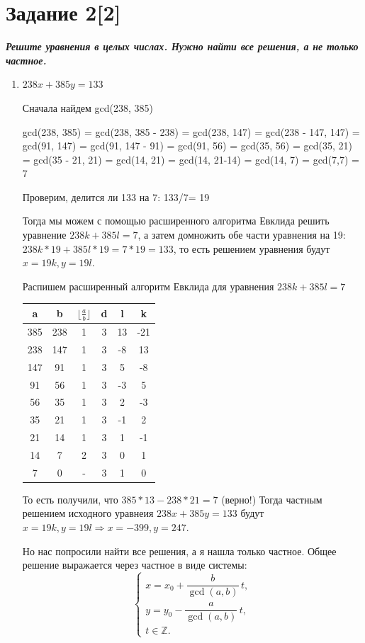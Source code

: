 \documentclass{article}
\begin{document}
\bigskip

\section*{\textbf{Задание 2[2]}} \textbf{\textit{Решите уравнения в целых числах. Нужно найти все решения, а не только частное.}}

\begin{enumerate}
    \item $238x + 385y = 133$

Сначала найдем gcd(238, 385)
 
 gcd(238, 385) = gcd(238, 385 - 238) =  gcd(238, 147) =  gcd(238 - 147, 147) =  gcd(91, 147) =  gcd(91, 147 - 91) =  gcd(91, 56) =  gcd(35, 56) =  gcd(35, 21) =  gcd(35 - 21, 21) =  gcd(14, 21) =  gcd(14, 21-14) =  gcd(14, 7) =  gcd(7,7) = 7

Проверим, делится ли 133 на 7: 133/7= 19

Тогда мы можем с помощью расширенного алгоритма Евклида решить уравнение $238k + 385l = 7$, а затем домножить обе части уравнения на 19: $238k*19 + 385l*19 = 7*19 = 133$, то есть решением уравнения будут $x = 19k, y=19l$.

Распишем расширенный алгоритм Евклида для уравнения $238k + 385l = 7$

\begin{center}
\begin{tabular}{ |c|c|c|c|c|c| } 
\hline
a & b & $\lfloor \frac{a}{b} \rfloor$ & d & l & k \\
\hline
385 & 238 & 1 & 3 & 13 & -21 \\ 
238 & 147 & 1 & 3 & -8 & 13 \\ 
147 & 91 & 1 & 3 & 5 & -8 \\ 
91 & 56 & 1 & 3 & -3 & 5\\ 
56 & 35 & 1 & 3 & 2 & -3 \\ 
35 & 21& 1 & 3 & -1 & 2 \\ 
21 & 14 & 1 & 3 & 1 & -1 \\ 
14 & 7 & 2 & 3 & 0 & 1 \\ 
7 & 0 & - & 3 & 1 & 0 \\ 
\hline
\end{tabular}
\end{center}

То есть получили, что $385*13 - 238*21 = 7$ (верно!)
Тогда частным решением исходного уравнеия $238x + 385y = 133$ будут $x = 19k, y=19l \Rightarrow x = -399, y = 247$. 

Но нас попросили найти все решения, а я нашла только частное. Общее решение выражается через частное в виде системы:
\[
\begin{cases}
x = x_0 + \dfrac{b}{\gcd(a,b)}\,t, \\[6pt]
y = y_0 - \dfrac{a}{\gcd(a,b)}\,t, \\[4pt]
t \in \mathbb{Z}.
\end{cases}
\]


\end{enumerate}
\end{document}

